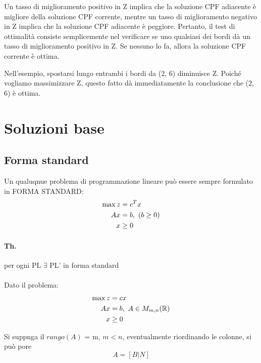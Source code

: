 \documentclass[a4paper, 11pt]{article}
\begin{document}
\begin{itemize}
                Un tasso di miglioramento positivo in Z implica che la soluzione CPF adiacente è migliore della soluzione CPF corrente, mentre un tasso di miglioramento negativo in Z implica che la soluzione CPF adiacente è peggiore. Pertanto, il test di ottimalità consiste semplicemente nel verificare se uno qualsiasi dei bordi dà un tasso di miglioramento positivo in Z. Se nessuno lo fa, allora la soluzione CPF corrente è ottima.
                
                Nell'esempio, spostarsi lungo entrambi i bordi da (2, 6) diminuisce Z. Poiché vogliamo massimizzare Z, questo fatto dà immediatamente la conclusione che (2, 6) è ottima.
            
        \end{itemize}

    \section{Soluzioni base}
        \subsection{Forma standard}
        Un qualuqnue problema di programmazione lineare può essere sempre formulato in FORMA STANDARD:
        \begin{align}
            \max{z} &= c^{T}x \notag \\
            Ax &= b, \text{ ($b \geq 0$)} \notag \\
            x & \geq 0 \notag 
        \end{align}

        \paragraph{Th. } per ogni PL $\exists$ PL' in forma standard

        \paragraph{}
        Dato il problema: 
        \begin{align}
            \max{z} &= cx \notag \\
                Ax &= b, \text{ } A \in M_{m,n}(\mathbb{R}) \notag \\
                x & \geq 0 \notag 
        \end{align}
        
        Si suppnga il $rango(A)$ = m, $m < n$, eventualmente riordinando le colonne, si può pore 
        \[
            A = [B|N]
        \]
\end{document}
